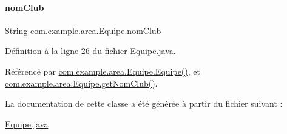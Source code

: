 \paragraph{\texorpdfstring{nom\+Club}{nomClub}}
{\footnotesize\ttfamily String com.\+example.\+area.\+Equipe.\+nom\+Club\hspace{0.3cm}{\ttfamily [private]}}



Définition à la ligne \hyperlink{_equipe_8java_source_l00026}{26} du fichier \hyperlink{_equipe_8java_source}{Equipe.\+java}.



Référencé par \hyperlink{_equipe_8java_source_l00030}{com.\+example.\+area.\+Equipe.\+Equipe()}, et \hyperlink{_equipe_8java_source_l00043}{com.\+example.\+area.\+Equipe.\+get\+Nom\+Club()}.



La documentation de cette classe a été générée à partir du fichier suivant \+:\begin{DoxyCompactItemize}
\item 
\hyperlink{_equipe_8java}{Equipe.\+java}\end{DoxyCompactItemize}
